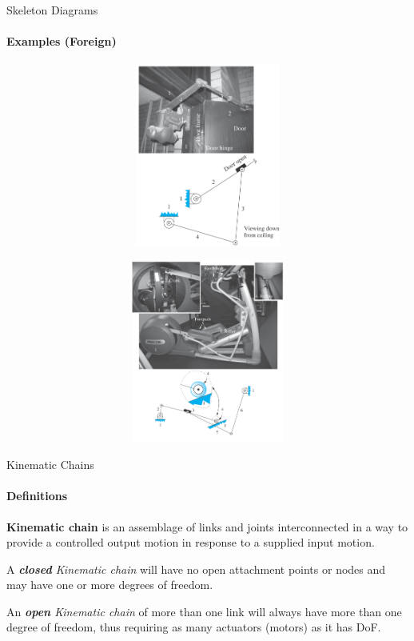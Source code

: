 \documentclass[aspectratio=169]{beamer}
\begin{document}
\begin{frame}[t]{Skeleton Diagrams}
    \framesubtitle{Examples (Foreign)}
    \vspace{-0.5cm}
    \begin{figure}[H]
        \begin{subfigure}{0.49\textwidth}
            \centering\includegraphics[height=6cm,width=1\textwidth,keepaspectratio]{en1_mech.png}
            \label{fig:en1_mech.png}
        \end{subfigure}
        \begin{subfigure}{0.49\textwidth}
            \centering\includegraphics[height=6cm,width=1\textwidth,keepaspectratio]{en2_mech.png}
            \label{fig:en2_mech.png}
        \end{subfigure}
    \end{figure}       
    \end{frame}

\begin{frame}[t]{Kinematic Chains}
\framesubtitle{Definitions}
\textbf{Kinematic chain} is an assemblage of links and joints interconnected in a way to provide a controlled output motion in response to a supplied input motion.

A \textit{\textbf{closed} Kinematic chain} will have no open attachment 
points or nodes and may have one or more degrees of freedom.

An \textit{\textbf{open} Kinematic chain} of more than one link will always have more than one degree of freedom, thus requiring as many actuators (motors) as it has DoF.
\end{frame}
\end{document}
